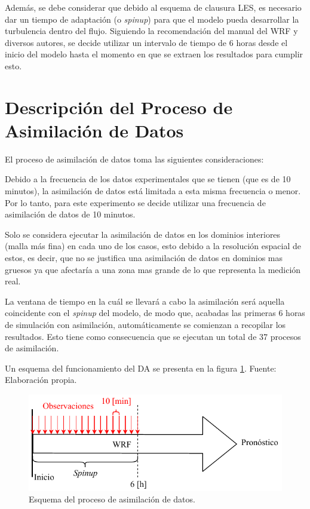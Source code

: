 Además, se debe considerar que debido al esquema de clausura LES, es necesario dar un tiempo de adaptación (o \emph{spinup}) para que el modelo pueda desarrollar la turbulencia dentro del flujo. Siguiendo la recomendación del manual del WRF y diversos autores, se decide utilizar un intervalo de tiempo de 6 horas desde el inicio del modelo hasta el momento en que se extraen los resultados para cumplir esto.

\newpage
\section{Descripción del Proceso de Asimilación de Datos}
El proceso de asimilación de datos toma las siguientes consideraciones:
\begin{itemize*}
	\item Debido a la frecuencia de los datos experimentales que se tienen (que es de 10 minutos), la asimilación de datos está limitada a esta misma frecuencia o menor. Por lo tanto, para este experimento se decide utilizar una frecuencia de asimilación de datos de 10 minutos.
	\item Solo se considera ejecutar la asimilación de datos en los dominios interiores (malla más fina) en cada uno de los casos, esto debido a la resolución espacial de estos, es decir, que no se justifica una asimilación de datos en dominios mas gruesos ya que afectaría a una zona mas grande de lo que representa la medición real.
	\item La ventana de tiempo en la cuál se llevará a cabo la asimilación será aquella coincidente con el \emph{spinup} del modelo, de modo que, acabadas las primeras 6 horas de simulación con asimilación, automáticamente se comienzan a recopilar los resultados. Esto tiene como consecuencia que se ejecutan un total de 37 procesos de asimilación.
\end{itemize*}
Un esquema del funcionamiento del DA se presenta en la figura \ref{fig:05_da}. Fuente: Elaboración propia.

\begin{figure}[H]
	\centering
		\includegraphics[width=0.95\linewidth,page=1,trim={0cm 0cm 0cm 0cm},clip]{Imagenes/05/da}%
	\caption{Esquema del proceso de asimilación de datos.}
	\label{fig:05_da}
\end{figure}

